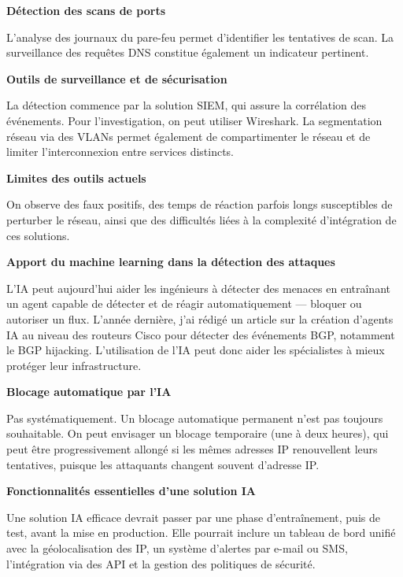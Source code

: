 \documentclass[12pt,a4paper]{report}
\begin{document}
\bigskip
\textbf{Détection des scans de ports}

L'analyse des journaux du pare-feu permet d'identifier les tentatives de scan. La surveillance des requ\^{e}tes DNS constitue \'{e}galement un indicateur pertinent.

\bigskip
\textbf{Outils de surveillance et de sécurisation}

La d\'{e}tection commence par la solution SIEM, qui assure la corr\'{e}lation des \'{e}v\'{e}nements. Pour l'investigation, on peut utiliser Wireshark. La segmentation r\'{e}seau via des VLANs permet \'{e}galement de compartimenter le r\'{e}seau et de limiter l'interconnexion entre services distincts.

\bigskip
\textbf{Limites des outils actuels}

On observe des faux positifs, des temps de r\'{e}action parfois longs susceptibles de perturber le r\'{e}seau, ainsi que des difficult\'{e}s li\'{e}es \`{a} la complexit\'{e} d'int\'{e}gration de ces solutions.

\bigskip
\textbf{Apport du machine learning dans la détection des attaques}

L'IA peut aujourd'hui aider les ing\'{e}nieurs \`{a} d\'{e}tecter des menaces en entra\^{i}nant un agent capable de d\'{e}tecter et de r\'{e}agir automatiquement --- bloquer ou autoriser un flux. L'ann\'{e}e derni\`{e}re, j'ai r\'{e}dig\'{e} un article sur la cr\'{e}ation d'agents IA au niveau des routeurs Cisco pour d\'{e}tecter des \'{e}v\'{e}nements BGP, notamment le BGP hijacking. L'utilisation de l'IA peut donc aider les sp\'{e}cialistes \`{a} mieux prot\'{e}ger leur infrastructure.

\bigskip
\textbf{Blocage automatique par l'IA}

Pas syst\'{e}matiquement. Un blocage automatique permanent n'est pas toujours souhaitable. On peut envisager un blocage temporaire (une \`{a} deux heures), qui peut \^{e}tre progressivement allong\'{e} si les m\^{e}mes adresses IP renouvellent leurs tentatives, puisque les attaquants changent souvent d'adresse IP.

\bigskip
\textbf{Fonctionnalités essentielles d'une solution IA}

Une solution IA efficace devrait passer par une phase d'entra\^{i}nement, puis de test, avant la mise en production. Elle pourrait inclure un tableau de bord unifi\'{e} avec la g\'{e}olocalisation des IP, un syst\`{e}me d'alertes par e-mail ou SMS, l'int\'{e}gration via des API et la gestion des politiques de s\'{e}curit\'{e}.
\end{document}
